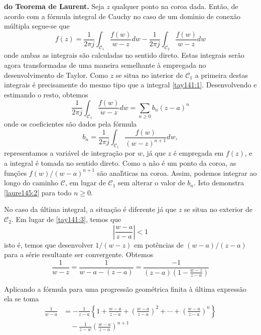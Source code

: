 \prova \textbf{do Teorema de Laurent.} Seja $z$ qualquer ponto na
coroa dada. Ent\~{a}o, de acordo com a f\'{o}rmula integral de Cauchy no
caso de um dom\'{\i}nio de conex\~{a}o m\'{u}ltipla segue-se que
\begin{equation}\label{laure145:5}
 f(z)=\frac{1}{2\pi j}\int_{\mathcal{C}_1}\frac{f(w)}{w -
z}dw-\frac{1}{2\pi j}\int_{\mathcal{C}_2}\frac{f(w)}{w - z}dw
\end{equation}
onde ambas as integrais s\~{a}o calculadas no sentido direto. Estas
integrais ser\~{a}o agora transformadas de uma maneira semelhante \`{a}
empregada no desenvolvimento de Taylor. Como $z$ se situa no
interior de $\mathcal{C}_1$ a primeira destas integrais \'{e}
precisamente do mesmo tipo que a integral \eqref{tay141:1}.
Desenvolvendo e estimando o resto, obtemos
\begin{equation}\label{laure145:6}
\frac{1}{2\pi j}\int_{\mathcal{C}_1}\frac{f(w)}{w -
z}dw=\sum_{n\geq 0}b_n(z-a)^n
\end{equation}
onde os coeficientes s\~{a}o dados pela f\'{o}rmula
\begin{equation}\label{laure145:7}
b_n=\frac{1}{2\pi j}\int_{\mathcal{C}_1}\frac{f(w)}{(w -
z)^{n+1}}dw,
\end{equation}
representamos a vari\'{a}vel de integra\c{c}\~{a}o por $w$, j\'{a} que $z$ \'{e}
empregada em $f(z)$, e a integral \'{e} tomada no sentido direto. Como
a n\~{a}o \'{e} um ponto da coroa, as fun\c{c}\~{o}es $f(w)/(w - a)^{n+1}$ s\~{a}o
anal\'{\i}ticas na coroa. Assim, podemos integrar ao longo do caminho
$\mathcal{C}$, em lugar de $\mathcal{C}_1$ sem alterar o valor de
$b_n$.\; Isto demonstra \eqref{laure145:2} para todo $n\geq 0$.

No caso da \'{u}ltima integral, a situa\c{c}\~{a}o \'{e} diferente j\'{a} que $z$ se
situa no exterior de $\mathcal{C}_2$. Em lugar de
\eqref{tay141:3}, temos que
\begin{equation}\label{laure145:8}
 \left|\frac{w - a}{z - a}\right| < 1
\end{equation}
isto \'{e}, temos que desenvolver $1/(w - z)$ em pot\^{e}ncias de $(w -
a)/(z - a)$ para a s\'{e}rie resultante ser convergente. Obtemos
\begin{equation*}
\frac{1}{w- z}= \frac{1}{w - a - (z - a)}= \frac{-1}{(z - a)
\left(1- \frac{w - z}{z - a}\right)}
\end{equation*}

Aplicando a f\'{o}rmula para uma progress\~{a}o geom\'{e}trica finita \`{a} \'{u}ltima
express\~{a}o ela se toma
\begin{align*}
\frac{1}{w - a}&=- \frac{1}{z- a}\left\{1+\frac{w-a}{z-a} +
\left(\frac{w - a}{z- a}\right)^2+\cdots+\left(\frac{w -
a}{z-a}\right)^n\right\}\\[2ex]
&\quad-\frac{1}{z-w}\left(\frac{w - a}{z-a}\right)^{n+1}
\end{align*}

